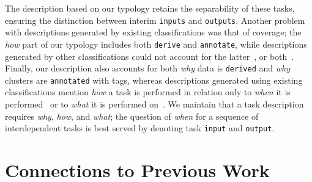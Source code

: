 The description based on our typology retains the separability of these tasks, ensuring the distinction between interim {\tt inputs} and {\tt outputs}.
Another problem with descriptions generated by existing classifications was that of coverage; the {\it how} part of our typology includes both {\tt derive} and {\tt annotate}, while descriptions generated by other classifications could not account for the latter~\cite{Amar2005,Chi1998}, or both~\cite{Pike2009,Shneiderman1996,Valiati2006,Wehrend1990,Yi2007,Zhou1998}.
Finally, our description also accounts for both {\it why} data is {\tt derived} and {\it why} clusters are {\tt annotated} with tags, whereas descriptions generated using existing classifications mention {\it how} a task is performed in relation only to {\it when} it is performed~\cite{Chi1998} or to {\it what} it is performed on~\cite{Chuah1996}.
We maintain that a task description requires {\it why}, {\it how}, and {\it what}; the question of {\it when} for a sequence of interdependent tasks is best served by denoting task {\tt input} and {\tt output}.


\section{Connections to Previous Work}
\label{typology:rw}


